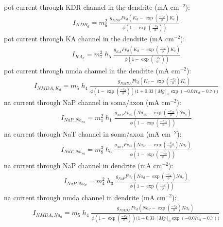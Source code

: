 \documentclass[11pt]{elsarticle}
\newcommand{\mAcm}{mA cm$^{-2}$\xspace}
\newcommand{\na}{\gls{na}\xspace}
\newcommand{\pot}{\gls{pot}\xspace}
\begin{document}
%
\pot current through KDR channel in the dendrite (\mAcm):
\begin{align}
I_{KDR_{d}} = m_6^2 \; \frac{  g_{KDR} F v_{d} \left( K_{d} - \exp \left( \frac{-v_{d}}{\phi}  \right) K_e  \right)   }{   \phi \left( 1 - \exp  \left(  \frac{-v_{d}}{\phi}  \right)  \right)   }
\end{align}
%		
\pot current through KA channel in the dendrite (\mAcm):
\begin{align}
I_{KA_{d}} = m_7^2 \; h_5 \; \frac{  g_{KA} F v_{d} \left( K_{d} - \exp \left( \frac{-v_{d}}{\phi}  \right) K_e  \right)   }{   \phi \left( 1 - \exp  \left(  \frac{-v_{d}}{\phi}  \right)  \right)   }
\end{align}
%
\pot current through \gls{nmda} channel in the dendrite (\mAcm):
\begin{align}
I_{NMDA,K_{d}} = m_5 \; h_4 \; \frac{  g_{NMDA} F v_{d} \left( K_{d} - \exp \left( \frac{-v_{d}}{\phi}  \right) K_e  \right)   }{   \phi \left( 1 - \exp  \left(  \frac{-v_{d}}{\phi}  \right)  \right)  \Big(  1 + 0.33 \: [Mg]_0 \exp (-0.07 v_d - 0.7 ) \Big) } 
\end{align}		
%
\na current through NaP channel in soma/axon (\mAcm):
\begin{align}
I_{NaP,Na_{sa}}    = m_1^2 \; h_1 \; \frac{  g_{NaP} F v_{sa} \left( Na_{sa} - \exp \left( \frac{-v_{sa}}{\phi}  \right) Na_e  \right)   }{   \phi \left( 1 - \exp  \left(  \frac{-v_{sa}}{\phi}  \right)  \right)   }
\end{align}
%
\na current through NaT channel in soma/axon (\mAcm):
\begin{align}
I_{NaT,Na_{sa}}    = m_8^3 \; h_6 \; \frac{  g_{NaT} F v_{sa} \left( Na_{sa} - \exp \left( \frac{-v_{sa}}{\phi}  \right) Na_e  \right)   }{   \phi \left( 1 - \exp  \left(  \frac{-v_{sa}}{\phi}  \right)  \right)   }
\end{align}
%		
\na current through NaP channel in dendrite (\mAcm):
\begin{align}
I_{NaP,Na_{d}}    = m_4^2 \; h_3 \; \frac{  g_{NaP} F v_{d} \left( Na_{d} - \exp \left( \frac{-v_{d}}{\phi}  \right) Na_e  \right)   }{   \phi \left( 1 - \exp  \left(  \frac{-v_{d}}{\phi}  \right)  \right)   }
\end{align}
%
\na current through \gls{nmda} channel in dendrite (\mAcm):
\begin{align}
I_{NMDA,Na_{d}} = m_5 \; h_4 \; \frac{  g_{NMDA} F v_{d} \left( Na_{d} - \exp \left( \frac{-v_{d}}{\phi}  \right) Na_e  \right)   }{   \phi \left( 1 - \exp  \left(  \frac{-v_{d}}{\phi}  \right)  \right)  \Big(  1 + 0.33 \: [Mg]_0 \exp (-0.07 v_d - 0.7 ) \Big) } 
\end{align}		
\end{document}
